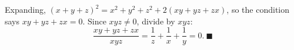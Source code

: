 Expanding, $(x+y+z)^2=x^2+y^2+z^2+2(xy+yz+zx)$, so the condition says $xy+yz+zx=0$. Since $xyz\ne0$, divide by $xyz$:
\[\dfrac{xy+yz+zx}{xyz}=\dfrac1z+\dfrac1x+\dfrac1y=0.\ \blacksquare\]
